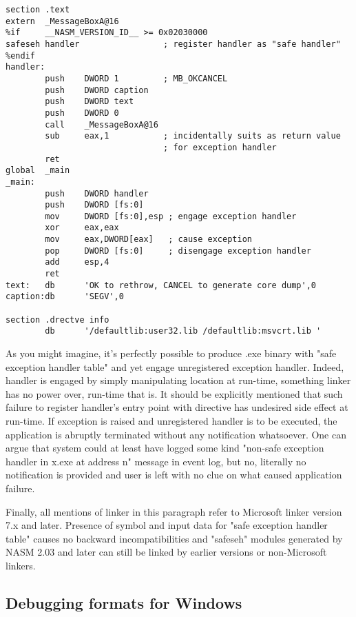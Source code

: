 \begin{lstlisting}
section .text
extern  _MessageBoxA@16
%if     __NASM_VERSION_ID__ >= 0x02030000
safeseh handler                 ; register handler as "safe handler"
%endif
handler:
        push    DWORD 1         ; MB_OKCANCEL
        push    DWORD caption
        push    DWORD text
        push    DWORD 0
        call    _MessageBoxA@16
        sub     eax,1           ; incidentally suits as return value
                                ; for exception handler
        ret
global  _main
_main:
        push    DWORD handler
        push    DWORD [fs:0]
        mov     DWORD [fs:0],esp ; engage exception handler
        xor     eax,eax
        mov     eax,DWORD[eax]   ; cause exception
        pop     DWORD [fs:0]     ; disengage exception handler
        add     esp,4
        ret
text:   db      'OK to rethrow, CANCEL to generate core dump',0
caption:db      'SEGV',0

section .drectve info
        db      '/defaultlib:user32.lib /defaultlib:msvcrt.lib '
\end{lstlisting}

As you might imagine, it's perfectly possible to produce .exe binary
with "safe exception handler table" and yet engage unregistered
exception handler. Indeed, handler is engaged by simply manipulating
\code{[fs:0]} location at run-time, something linker has no power over,
run-time that is. It should be explicitly mentioned that such failure
to register handler's entry point with  directive has
undesired side effect at run-time. If exception is raised and
unregistered handler is to be executed, the application is abruptly
terminated without any notification whatsoever. One can argue that
system could  at least have logged some kind "non-safe exception
handler in x.exe at address n" message in event log, but no, literally
no notification is provided and user is left with no clue on what
caused application failure.

Finally, all mentions of linker in this paragraph refer to Microsoft
linker version 7.x and later. Presence of  symbol and input
data for "safe exception handler table" causes no backward
incompatibilities and "safeseh" modules generated by NASM 2.03 and
later can still be linked by earlier versions or non-Microsoft linkers.

\subsection{Debugging formats for Windows}
\label{subsec:codeview}

